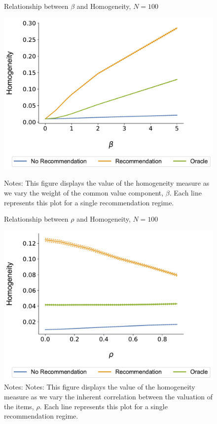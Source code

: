 \documentclass[format=acmsmall, review=true]{acmart}
\begin{document}
\begin{figure}[ht]
\caption{Relationship between $\beta$ and Homogeneity, $N = 100$}
\includegraphics[width=.45\linewidth]{figures/beta_homogeneity_N_100_T_20}\label{fig:beta_homo}
\caption*{\scriptsize Notes: This figure displays the value of the homogeneity measure as we vary the weight of the common value component, $\beta$. Each line represents this plot for a single recommendation regime.}
\end{figure}
\begin{figure}[ht]
\caption{Relationship between $\rho$ and Homogeneity, $N = 100$}
\includegraphics[width=.45\linewidth]{figures/rho_homogeneity_N_100_T_20}
\caption*{\scriptsize Notes: Notes: This figure displays the value of the homogeneity measure as we vary the inherent correlation between the valuation of the items, $\rho$. Each line represents this plot for a single recommendation regime.}\label{fig:cor_homo}
\end{figure}
\end{document}
